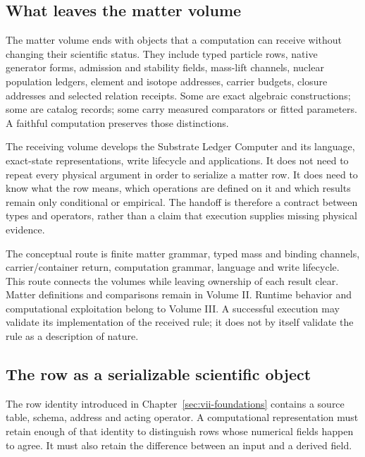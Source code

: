 \label{sec:vii-handoff}

\subsection{What leaves the matter volume}

The matter volume ends with objects that a computation can receive without changing their scientific status. They include typed particle rows, native generator forms, admission and stability fields, mass-lift channels, nuclear population ledgers, element and isotope addresses, carrier budgets, closure addresses and selected relation receipts. Some are exact algebraic constructions; some are catalog records; some carry measured comparators or fitted parameters. A faithful computation preserves those distinctions.

The receiving volume develops the Substrate Ledger Computer and its language, exact-state representations, write lifecycle and applications. It does not need to repeat every physical argument in order to serialize a matter row. It does need to know what the row means, which operations are defined on it and which results remain only conditional or empirical. The handoff is therefore a contract between types and operators, rather than a claim that execution supplies missing physical evidence.\cite{viisama,viispine}

The conceptual route is finite matter grammar, typed mass and binding channels, carrier/container return, computation grammar, language and write lifecycle. This route connects the volumes while leaving ownership of each result clear. Matter definitions and comparisons remain in Volume II. Runtime behavior and computational exploitation belong to Volume III. A successful execution may validate its implementation of the received rule; it does not by itself validate the rule as a description of nature.

\subsection{The row as a serializable scientific object}

The row identity introduced in Chapter~\ref{sec:vii-foundations} contains a source table, schema, address and acting operator. A computational representation must retain enough of that identity to distinguish rows whose numerical fields happen to agree. It must also retain the difference between an input and a derived field.

